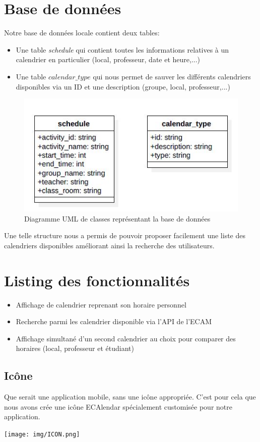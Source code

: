 \documentclass{article}
\begin{document}
	\section{Base de données}
	Notre base de données locale contient deux tables:
	\begin{itemize}
		\item Une table \textit{schedule} qui contient toutes les informations relatives à un calendrier en particulier (local, professeur, date et heure,...)
		\item Une table \textit{$calendar\_type$} qui nous permet de sauver les différents calendriers disponibles via un ID et une description (groupe, local, professeur,...)
		
	\end{itemize}
	\begin{figure}[!h]
		\centering
		\includegraphics[scale=0.9]{img/uml_db.jpg}
		\caption{Diagramme UML de classes représentant la base de données}
	\end{figure}
	Une telle structure nous a permis de pouvoir proposer facilement une liste des calendriers disponibles améliorant ainsi la recherche des utilisateurs. 
		
	\section{Listing des fonctionnalités}
    \begin{itemize}
        \item Affichage de calendrier reprenant son horaire personnel
        \item Recherche parmi les calendrier disponible via l'API de l'ECAM
        \item Affichage simultané d'un second calendrier au choix pour comparer des horaires (local, professeur et étudiant)
    \end{itemize}

	\subsection{Icône}
	 Que serait une application mobile, sans une icône appropri\'ee. C'est pour cela que nous avons cr\'ee une icône ECAlendar spécialement customis\'ee pour notre application.
	   \begin{center}
            \texttt{[image: img/ICON.png]}
        \end{center}
\end{document}
